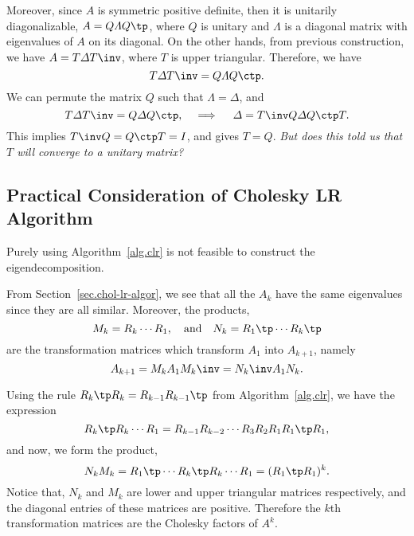 Moreover, since $A$ is symmetric positive definite, then it is unitarily
diagonalizable, $A = Q\varLambda Q\tp$, where $Q$ is unitary and
$\varLambda$ is a diagonal matrix with eigenvalues of $A$ on its diagonal.
On the other hands, from previous construction,
we have $A = T\varDelta T\inv$, where $T$ is upper triangular.
Therefore, we have
\begin{equation}\notag
  T\varDelta T\inv = Q \varLambda Q\ctp.
\end{equation}
We can permute the matrix $Q$ such that $\varLambda = \varDelta$, and
\begin{equation}\notag
  T\varDelta T\inv = Q \varDelta Q\ctp, \quad \implies \quad
  \varDelta = T\inv Q \varDelta Q\ctp T.
\end{equation}
This implies $T\inv Q = Q\ctp T = I$, and gives $T = Q$.
\emph{But does this told us that $T$ will converge to a unitary matrix?}

\subsection{Practical Consideration of Cholesky LR Algorithm}
\label{sec.pract-cons-chol}
Purely using Algorithm~\ref{alg.clr} is not feasible to construct the
eigendecomposition.

From Section~\ref{sec.chol-lr-algor}, we see that all the $A_{k}$ have the
same eigenvalues since they are all similar. Moreover, the products,
\begin{equation}\notag
  M_{k} = R_{k}\cdots R_{1}, \quad \text{and}\quad
  N_{k} = R_{1}\tp \cdots R_{k}\tp
\end{equation}
are the transformation matrices which transform $A_{1}$ into $A_{k+1}$,
namely
\begin{equation}\notag
  A_{k+1} = M_{k} A_{1} M_{k}\inv = N_{k}\inv A_{1} N_{k}.
\end{equation}

Using the rule $R_{k}\tp R_{k} = R_{k-1} R_{k-1}\tp$ from
Algorithm~\ref{alg.clr}, we have the expression
\begin{equation}\notag
  R_{k}\tp R_{k} \cdots R_{1}
  = R_{k-1}R_{k-2} \cdots R_{3}R_{2}R_{1} R_{1}\tp R_{1},
\end{equation}
and now, we form the product,
\begin{equation}\label{eq.trans-product-chol}
  N_{k} M_{k} = R_{1}\tp \cdots R_{k}\tp R_{k}\cdots R_{1} = (R_{1}\tp R_{1})^{k}.
\end{equation}
Notice that, $N_{k}$ and $M_{k}$ are lower and upper triangular matrices
respectively, and the diagonal entries of these matrices are positive.
Therefore the $k$th transformation matrices are the Cholesky
factors of $A^{k}$.

